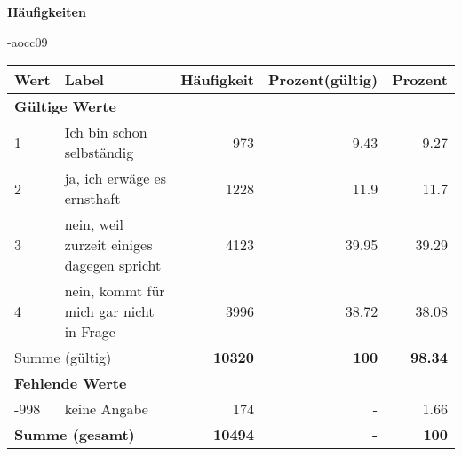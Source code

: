         		\vspace*{0.5cm}
                \noindent\textbf{Häufigkeiten}

                \vspace*{-\baselineskip}
					\begin{filecontents}{\jobname-aocc09}
					\begin{longtable}{lXrrr}
					\toprule
					\textbf{Wert} & \textbf{Label} & \textbf{Häufigkeit} & \textbf{Prozent(gültig)} & \textbf{Prozent} \\
					\endhead
					\midrule
					\multicolumn{5}{l}{\textbf{Gültige Werte}}\\

					1 &
					\multicolumn{1}{X}{ Ich bin schon selbständig   } &


					  \num{973} &
					  \num[round-mode=places,round-precision=2]{9,43} &
					    \num[round-mode=places,round-precision=2]{9,27} \\

					2 &
					\multicolumn{1}{X}{ ja, ich erwäge es ernsthaft   } &


					  \num{1228} &
					  \num[round-mode=places,round-precision=2]{11,9} &
					    \num[round-mode=places,round-precision=2]{11,7} \\

					3 &
					\multicolumn{1}{X}{ nein, weil zurzeit einiges dagegen spricht   } &


					  \num{4123} &
					  \num[round-mode=places,round-precision=2]{39,95} &
					    \num[round-mode=places,round-precision=2]{39,29} \\

					4 &
					\multicolumn{1}{X}{ nein, kommt für mich gar nicht in Frage   } &


					  \num{3996} &
					  \num[round-mode=places,round-precision=2]{38,72} &
					    \num[round-mode=places,round-precision=2]{38,08} \\
					\midrule
					\multicolumn{2}{l}{Summe (gültig)} &
					  \textbf{\num{10320}} &
					\textbf{100} &
					  \textbf{\num[round-mode=places,round-precision=2]{98,34}} \\
					\multicolumn{5}{l}{\textbf{Fehlende Werte}}\\
							-998 &
							keine Angabe &
							  \num{174} &
							 - &
							  \num[round-mode=places,round-precision=2]{1,66} \\
					\midrule
					\multicolumn{2}{l}{\textbf{Summe (gesamt)}} &
				      \textbf{\num{10494}} &
				    \textbf{-} &
				    \textbf{100} \\
					\bottomrule
					\end{longtable}
					\end{filecontents}
